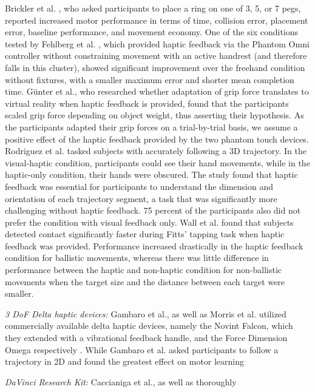 Brickler et al. \cite{Brickler2019}, who asked participants to place a ring on one of 3, 5, or 7 pegs, reported increased motor performance in terms of time, collision error, placement error, baseline performance, and movement economy. One of the six conditions tested by Fehlberg et al. \cite{Fehlberg2012}, which provided haptic feedback via the Phantom Omni controller without constraining movement with an active handrest (and therefore falls in this cluster), showed significant improvement over the freehand condition without fixtures, with a smaller maximum error and shorter mean completion time. Günter et al., who researched whether adaptation of grip force translates to virtual reality when haptic feedback is provided, found that the participants scaled grip force depending on object weight, thus asserting their hypothesis. As the participants adapted their grip forces on a trial-by-trial basis, we assume a positive effect of the haptic feedback provided by the two phantom touch devices. 
Rodriguez et al. \cite{Rodriguez2010} tasked subjects with accurately following a 3D trajectory. In the visual-haptic condition, participants could see their hand movements, while in the haptic-only condition, their hands were obscured. The study found that haptic feedback was essential for participants to understand the dimension and orientation of each trajectory segment, a task that was significantly more challenging without haptic feedback. 75 percent of the participants also did not prefer the condition with visual feedback only. Wall et al. \cite{Wall2000} found that subjects detected contact significantly faster during Fitts' tapping task when haptic feedback was provided. Performance increased drastically in the haptic feedback condition for ballistic movements, whereas there was little difference in performance between the haptic and non-haptic condition for non-ballistic movements when the target size and the distance between each target were smaller.

\textit{3 DoF Delta haptic devices:} Gambaro et al., as well as Morris et al. utilized commercially available delta haptic devices, namely the Novint Falcon, which they extended with a vibrational feedback handle, and the Force Dimension Omega respectively \cite{Gambaro2014, Morris2007}. While Gambaro et al. asked participants to follow a trajectory in 2D and found the greatest effect on motor learning %

\textit{DaVinci Research Kit:} Caccianiga et al., as well as thoroughly


